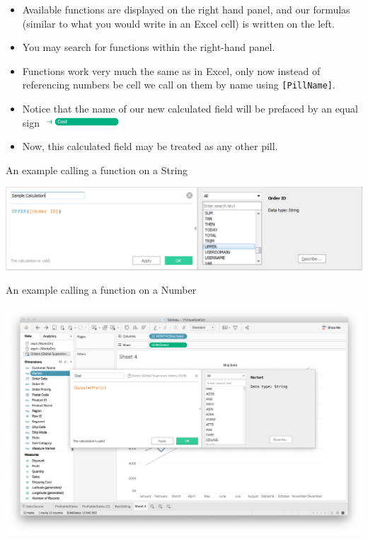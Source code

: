 \documentclass[xcolor=svgnames]{beamer} %
\begin{document}
\begin{frame}
\begin{itemize}
\item Available functions are displayed on the right hand panel, and our formulas (similar to what you would write in an Excel cell) is written on the left.
\vfill
\item You may search for functions within the right-hand panel.
\vfill
\item Functions work very much the same as in Excel, only now instead of referencing numbers be cell we call on them by name using {\tt [PillName]}. %
\vfill
\item Notice that the name of our new calculated field will be prefaced by an equal sign \includegraphics[height=1em]{img/equalsign}
\vfill
\item Now, this calculated field may be treated as any other pill.
\vfill
\end{itemize}
\end{frame}



\begin{frame}
An example calling a function on a String
\begin{center}
\includegraphics[width=.99\textwidth]{img/field}
\end{center}
\end{frame}

\begin{frame}
An example calling a function on a Number
\begin{center}
\includegraphics[width=.99\textwidth]{img/formula}
\end{center}
\end{frame}
\end{document}
